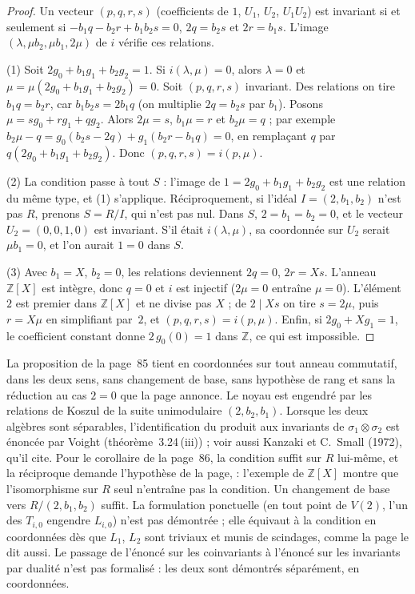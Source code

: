 \begin{proof}
Un vecteur $(p, q, r, s)$ (coefficients de $1$, $U_1$, $U_2$, $U_1U_2$) est invariant si et seulement si $-b_1q - b_2r + b_1b_2s = 0$, $2q = b_2s$ et $2r = b_1s$. L'image $(\lambda, \mu b_2, \mu b_1, 2\mu)$ de $i$ vérifie ces relations.

(1) Soit $2g_0 + b_1g_1 + b_2g_2 = 1$. Si $i(\lambda, \mu) = 0$, alors $\lambda = 0$ et $\mu = \mu(2g_0 + b_1g_1 + b_2g_2) = 0$. Soit $(p, q, r, s)$ invariant. Des relations on tire $b_1q = b_2r$, car $b_1b_2s = 2b_1q$ (on multiplie $2q = b_2s$ par $b_1$). Posons $\mu = sg_0 + rg_1 + qg_2$. Alors $2\mu = s$, $b_1\mu = r$ et $b_2\mu = q$ ; par exemple $b_2\mu - q = g_0(b_2s - 2q) + g_1(b_2r - b_1q) = 0$, en remplaçant $q$ par $q(2g_0 + b_1g_1 + b_2g_2)$. Donc $(p, q, r, s) = i(p, \mu)$.

(2) La condition passe à tout $S$ : l'image de $1 = 2g_0 + b_1g_1 + b_2g_2$ est une relation du même type, et (1) s'applique. Réciproquement, si l'idéal $I = (2, b_1, b_2)$ n'est pas $R$, prenons $S = R/I$, qui n'est pas nul. Dans $S$, $2 = b_1 = b_2 = 0$, et le vecteur $U_2 = (0, 0, 1, 0)$ est invariant. S'il était $i(\lambda, \mu)$, sa coordonnée sur $U_2$ serait $\mu b_1 = 0$, et l'on aurait $1 = 0$ dans $S$.

(3) Avec $b_1 = X$, $b_2 = 0$, les relations deviennent $2q = 0$, $2r = Xs$. L'anneau $\mathbb Z[X]$ est intègre, donc $q = 0$ et $i$ est injectif ($2\mu = 0$ entraîne $\mu = 0$). L'élément $2$ est premier dans $\mathbb Z[X]$ et ne divise pas $X$ ; de $2 \mid Xs$ on tire $s = 2\mu$, puis $r = X\mu$ en simplifiant par~$2$, et $(p, q, r, s) = i(p, \mu)$. Enfin, si $2g_0 + Xg_1 = 1$, le coefficient constant donne $2\,g_0(0) = 1$ dans $\mathbb Z$, ce qui est impossible.
\end{proof}

\begin{remarque}
La proposition de la page~85 tient en coordonnées sur tout anneau commutatif, dans les deux sens, sans changement de base, sans hypothèse de rang et sans la réduction au cas $2 = 0$ que la page annonce. Le noyau est engendré par les relations de Koszul de la suite unimodulaire $(2, b_2, b_1)$. Lorsque les deux algèbres sont séparables, l'identification du produit aux invariants de $\sigma_1 \otimes \sigma_2$ est énoncée par Voight (théorème~3.24\,(iii)) \cite{voight2016} ; voir aussi Kanzaki et C.~Small (1972), qu'il cite. Pour le corollaire de la page~86, la condition suffit sur $R$ lui-même, et la réciproque demande l'hypothèse de la page,  : l'exemple de $\mathbb Z[X]$ montre que l'isomorphisme sur $R$ seul n'entraîne pas la condition. Un changement de base vers $R/(2, b_1, b_2)$ suffit. La formulation ponctuelle (en tout point de $V(2)$, l'un des $T_{i,0}$ engendre $L_{i,0}$) n'est pas démontrée ; elle équivaut à la condition en coordonnées dès que $L_1$, $L_2$ sont triviaux et munis de scindages, comme la page le dit aussi. Le passage de l'énoncé sur les coinvariants à l'énoncé sur les invariants par dualité n'est pas formalisé : les deux sont démontrés séparément, en coordonnées.
\end{remarque}

